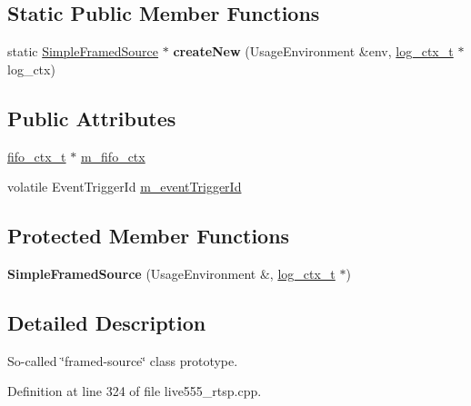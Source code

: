 \subsection*{Static Public Member Functions}
\begin{DoxyCompactItemize}
\item 
static \hyperlink{classSimpleFramedSource}{Simple\+Framed\+Source} $\ast$ {\bfseries create\+New} (Usage\+Environment \&env, \hyperlink{structlog__ctx__s}{log\+\_\+ctx\+\_\+t} $\ast$log\+\_\+ctx)\hypertarget{classSimpleFramedSource_a3c02f3f751c4298e6940b3745c9202ad}{}\label{classSimpleFramedSource_a3c02f3f751c4298e6940b3745c9202ad}

\end{DoxyCompactItemize}
\subsection*{Public Attributes}
\begin{DoxyCompactItemize}
\item 
\hyperlink{structfifo__ctx__s}{fifo\+\_\+ctx\+\_\+t} $\ast$ \hyperlink{classSimpleFramedSource_ab93999240c393d2d3035dc7e5292eb2c}{m\+\_\+fifo\+\_\+ctx}
\item 
volatile Event\+Trigger\+Id \hyperlink{classSimpleFramedSource_a6de7be242a550522e914316487fa112e}{m\+\_\+event\+Trigger\+Id}
\end{DoxyCompactItemize}
\subsection*{Protected Member Functions}
\begin{DoxyCompactItemize}
\item 
{\bfseries Simple\+Framed\+Source} (Usage\+Environment \&, \hyperlink{structlog__ctx__s}{log\+\_\+ctx\+\_\+t} $\ast$)\hypertarget{classSimpleFramedSource_ab1d618908865999c517ad8082657da00}{}\label{classSimpleFramedSource_ab1d618908865999c517ad8082657da00}

\end{DoxyCompactItemize}


\subsection{Detailed Description}
So-\/called \char`\"{}framed-\/source\char`\"{} class prototype. 

Definition at line 324 of file live555\+\_\+rtsp.\+cpp.



